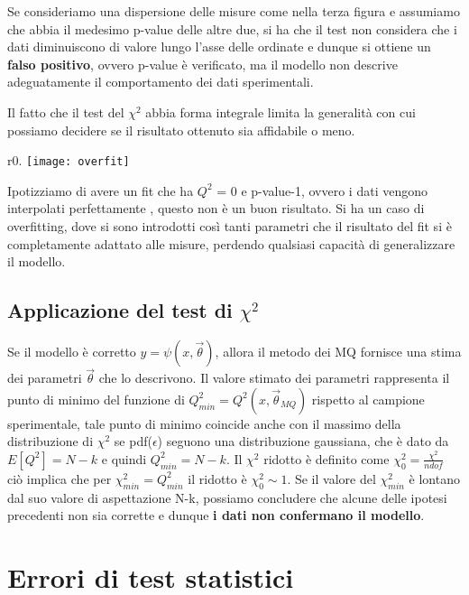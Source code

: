 \documentclass[11pt,a4paper]{book}
\begin{document}
Se consideriamo una dispersione delle misure come nella terza figura e
assumiamo che abbia il medesimo p-value delle altre due, si ha
che il test non considera che i dati diminuiscono di valore lungo l'asse delle ordinate e dunque si ottiene un \textbf{falso positivo}, ovvero p-value \`{e} verificato, ma il modello non descrive adeguatamente il comportamento dei dati sperimentali.

Il fatto che il test del $\chi^2$ abbia forma integrale limita la generalit\`{a} con cui possiamo decidere se il risultato ottenuto sia affidabile o meno.

\begin{wrapfigure}{r}{0.\textwidth}
\centering
\texttt{[image: overfit]}	
\end{wrapfigure}

\noindent Ipotizziamo di avere un fit che ha $Q^2$ = 0 e p-value-1,
ovvero i dati vengono interpolati perfettamente , questo non è
un buon risultato. Si ha un caso di overfitting, dove si sono introdotti così tanti parametri che
il risultato del fit si \`{e} completamente adattato alle misure, perdendo qualsiasi
capacit\`{a} di generalizzare il modello. 

\subsection{Applicazione del test di $\chi^2$}

Se il modello \`{e} corretto $y = \psi(x,\vec{\theta})$, allora il metodo dei MQ fornisce una stima dei parametri $\vec{\theta}$ che lo descrivono. Il valore stimato dei parametri rappresenta il punto di minimo del funzione di $Q^2_{min} = Q^2(x,\vec{\theta}_{MQ})$ rispetto al campione sperimentale, tale punto di minimo coincide anche con il massimo della distribuzione di $\chi^2$ se pdf($\epsilon$) seguono una distribuzione gaussiana, che \`{e} dato da $E[Q^2] = N-k$ e quindi $Q^2_{min} = N-k$. \newline
Il $\chi^2$ ridotto \`{e} definito come $\chi^2_{0} = \frac{\chi^2}{ndof}$ ci\`{o} implica che per $\chi^2_{min} = Q^2_{min}$ il ridotto \`{e} $\chi^2_0 \sim 1$. \newline
Se il valore del $\chi^2_{min}$ \`{e} lontano dal suo valore di aspettazione N-k, possiamo concludere che alcune delle ipotesi precedenti non sia corrette e dunque \textbf{i dati non confermano il modello}.

\section{Errori di test statistici}
\end{document}
